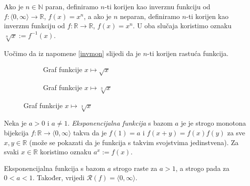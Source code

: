 \begin{definition}
Ako je $n\in \mathbb{N}$ paran, definiramo $n$-ti korijen kao inverznu funkciju od $f : \langle 0,\infty\rangle\to \mathbb{R}$, $f(x)=x^n$, a ako je $n$ neparan, definiramo $n$-ti korijen kao inverznu funkciju od $f : \mathbb{R}\to \mathbb{R}$, $f(x)=x^n$. U oba slučaja koristimo oznaku $\sqrt[n]{x}:=f^{-1}(x)$.
\end{definition}
Uočimo da iz napomene \ref{invmon} slijedi da je $n$-ti korijen rastuća funkcija.
\begin{figure}[ht]
\begin{subfigure}[t]{.5\textwidth}
\centering
{}
\caption*{Graf funkcije \(x\mapsto \sqrt{x}\)}
\end{subfigure}%
\begin{subfigure}[t]{.5\textwidth}
\centering
{}
\caption*{Graf funkcije \(x\mapsto \sqrt[3]{x}\)}
\end{subfigure}
\end{figure}
\begin{definition}
Neka je $a>0$ i $a\neq 1$. \textit{Eksponencijalna funkcija} s bazom $a$ je je strogo monotona bijekcija $f : \mathbb{R}\to \langle 0, \infty\rangle$ takva da je $f(1)=a$ i $f(x+y)=f(x)f(y)$ za sve $x, y\in \mathbb{R}$ (može se pokazati da je funkcija s takvim svojstvima jedinstvena). Za svaki $x\in \mathbb{R}$ koristimo oznaku $a^x:=f(x)$.
\end{definition}
\begin{remark}
Eksponencijalna funkcija s bazom $a$ strogo raste za $a>1$, a strogo pada za $0<a<1$. Također, vrijedi $\mathcal{R}(f)=\langle 0, \infty\rangle$.
\end{remark}
